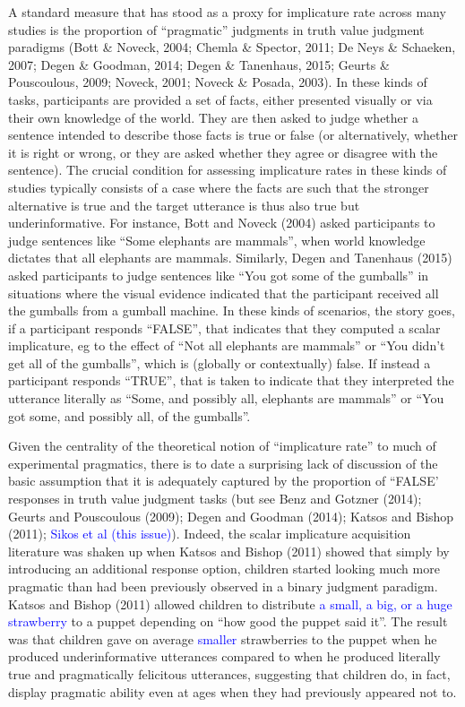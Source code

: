 \documentclass[man]{apa6}
\newcommand{\change}[1]{\textcolor{Blue}{#1}}
\theoremstyle{definition}
\theoremstyle{definition}
\theoremstyle{definition}
\theoremstyle{remark}
\begin{document}
A standard measure that has stood as a proxy for implicature rate across
many studies is the proportion of \enquote{pragmatic} judgments in truth
value judgment paradigms (Bott \& Noveck, 2004; Chemla \& Spector, 2011;
De Neys \& Schaeken, 2007; Degen \& Goodman, 2014; Degen \& Tanenhaus,
2015; Geurts \& Pouscoulous, 2009; Noveck, 2001; Noveck \& Posada,
2003). In these kinds of tasks, participants are provided a set of
facts, either presented visually or via their own knowledge of the
world. They are then asked to judge whether a sentence intended to
describe those facts is true or false (or alternatively, whether it is
right or wrong, or they are asked whether they agree or disagree with
the sentence). The crucial condition for assessing implicature rates in
these kinds of studies typically consists of a case where the facts are
such that the stronger alternative is true and the target utterance is
thus also true but underinformative. For instance, Bott and Noveck
(2004) asked participants to judge sentences like \enquote{Some
elephants are mammals}, when world knowledge dictates that all elephants
are mammals. Similarly, Degen and Tanenhaus (2015) asked participants to
judge sentences like \enquote{You got some of the gumballs} in
situations where the visual evidence indicated that the participant
received all the gumballs from a gumball machine. In these kinds of
scenarios, the story goes, if a participant responds \enquote{FALSE},
that indicates that they computed a scalar implicature, eg to the effect
of \enquote{Not all elephants are mammals} or \enquote{You didn't get
all of the gumballs}, which is (globally or contextually) false. If
instead a participant responds \enquote{TRUE}, that is taken to indicate
that they interpreted the utterance literally as ``Some, and possibly
all, elephants are mammals'' or \enquote{You got some, and possibly all,
of the gumballs}.

Given the centrality of the theoretical notion of \enquote{implicature
rate} to much of experimental pragmatics, there is to date a surprising
lack of discussion of the basic assumption that it is adequately
captured by the proportion of ``FALSE' responses in truth value judgment
tasks (but see Benz and Gotzner (2014); Geurts and Pouscoulous (2009);
Degen and Goodman (2014); Katsos and Bishop (2011); \change{Sikos et al (this issue)}). Indeed, the scalar
implicature acquisition literature was shaken up when Katsos and Bishop
(2011) showed that simply by introducing an additional response option,
children started looking much more pragmatic than had been previously
observed in a binary judgment paradigm. Katsos and Bishop (2011) allowed
children to distribute \change{a small, a big, or a huge strawberry } to a puppet depending on
\enquote{how good the puppet said it}. The result was that children gave
on average \change{smaller} strawberries to the puppet when he produced
underinformative utterances compared to when he produced literally true
and pragmatically felicitous utterances, suggesting that children do, in
fact, display pragmatic ability even at ages when they had previously
appeared not to.
\end{document}
